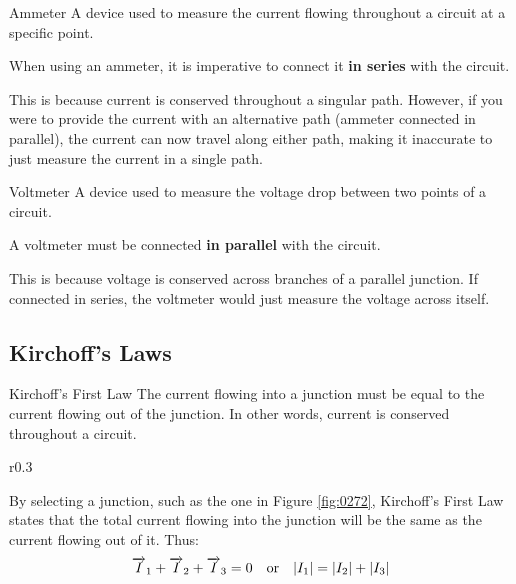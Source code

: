 \documentclass[12pt]{article}
\begin{document}
\begin{definition}{Ammeter}
  A device used to measure the current flowing throughout a circuit at a specific point.
\end{definition}

When using an ammeter, it is imperative to connect it \textbf{in series} with the circuit.
\begin{figure}[H]
  \centering
  
\end{figure}
This is because current is conserved throughout a singular path. However, if you were to
provide the current with an alternative path (ammeter connected in parallel), the current
can now travel along either path, making it inaccurate to just measure the current in a
single path.

\begin{definition}{Voltmeter}
  A device used to measure the voltage drop between two points of a circuit.
\end{definition}

A voltmeter must be connected \textbf{in parallel} with the circuit.
\begin{figure}[H]
  \centering
  
\end{figure}
This is because voltage is conserved across branches of a parallel junction. If connected
in series, the voltmeter would just measure the voltage across itself.

\subsection{Kirchoff's Laws}
\label{ssec:kirchoffsLaws}

\begin{definition}{Kirchoff's First Law}
  The current flowing into a junction must be equal to the current flowing out of the
  junction. In other words, current is conserved throughout a circuit.
\end{definition}

\begin{wrapfigure}[7]{r}{0.3\textwidth}
  \centering
  
  \caption{}
  \label{fig:0272}
\end{wrapfigure}
By selecting a junction, such as the one in Figure \ref{fig:0272}, Kirchoff's First Law
states that the total current flowing into the junction will be the same as the current flowing
out of it. Thus:
\begin{equation*}
  \overrightarrow{I}_1 + \overrightarrow{I}_2 + \overrightarrow{I}_3 = 0 \ \ \ \textup{or}\ \ \ |I_1| = |I_2| + |I_3|
\end{equation*}
\end{document}
